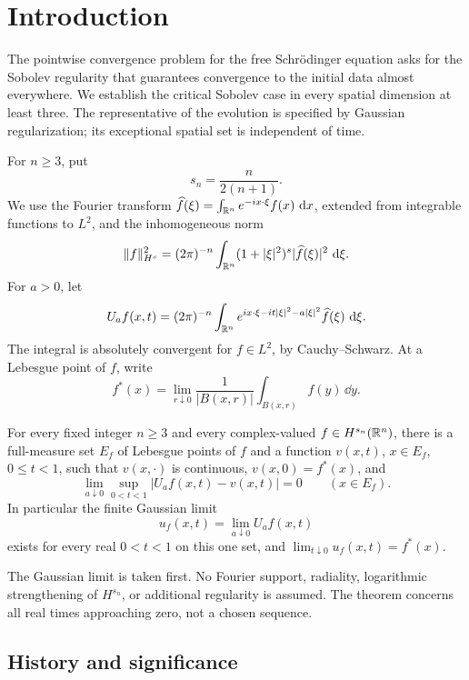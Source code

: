 \section{Introduction}

The pointwise convergence problem for the free Schr\"odinger equation
asks for the Sobolev regularity that guarantees convergence to the
initial data almost everywhere.  We establish the critical Sobolev
case in every spatial dimension at least three.  The representative
of the evolution is specified by Gaussian regularization; its
exceptional spatial set is independent of time.

For $n\geq3$, put
\[
 s_n=\frac{n}{2(n+1)}.
\]
We use the Fourier transform
$\widehat f(\xi)=\int_{\mathbb R^n}e^{-ix\cdot\xi}f(x)\,\,\mathrm d x$, extended
from integrable functions to $L^2$, and the inhomogeneous norm
\[
 \lVert f\rVert_{H^s}^2=(2\pi)^{-n}
 \int_{\mathbb R^n}(1+|\xi|^2)^s|\widehat f(\xi)|^2\,\,\mathrm d\xi.
\]
For $a>0$, let
\begin{equation}\label{m:eq-Gaussian}
 U_af(x,t)=(2\pi)^{-n}\int_{\mathbb R^n}
 e^{ix\cdot\xi-it|\xi|^2-a|\xi|^2}\widehat f(\xi)\,\,\mathrm d\xi.
\end{equation}
The integral is absolutely convergent for $f\in L^2$, by
Cauchy--Schwarz.  At a Lebesgue point of $f$, write
\[
 f^*(x)=\lim_{r\downarrow0}\frac1{|B(x,r)|}
                         \int_{B(x,r)}f(y)\,\dd y.
\]

\begin{theorem}\label{m:main}
For every fixed integer $n\geq3$ and every complex-valued
$f\in H^{s_n}(\mathbb R^n)$, there is a full-measure set $E_f$ of Lebesgue
points of $f$ and a function $v(x,t)$, $x\in E_f$, $0\leq t<1$, such
that $v(x,\cdot)$ is continuous, $v(x,0)=f^*(x)$, and
\begin{equation}\label{m:eq-uniform-Gaussian}
 \lim_{a\downarrow0}\sup_{0<t<1}|U_af(x,t)-v(x,t)|=0
 \qquad(x\in E_f).
\end{equation}
In particular the finite Gaussian limit
\[
 u_f(x,t)=\lim_{a\downarrow0}U_af(x,t)
\]
exists for every real $0<t<1$ on this one set, and
$\lim_{t\downarrow0}u_f(x,t)=f^*(x)$.
\end{theorem}

The Gaussian limit is taken first.  No Fourier support, radiality,
logarithmic strengthening of $H^{s_n}$, or additional regularity is
assumed.  The theorem concerns all real times approaching zero, not a
chosen sequence.

\subsection{History and significance}

